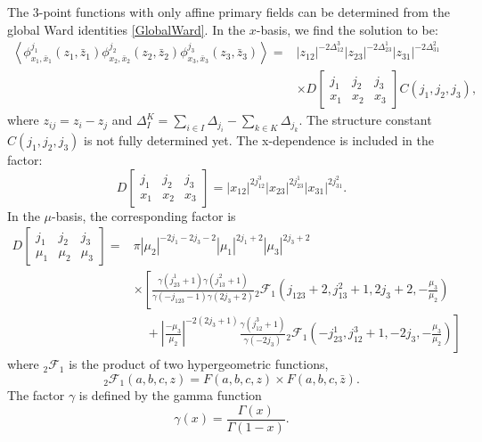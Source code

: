 \documentclass[10pt,a4paper]{article}
\numberwithin{equation}{section}
\newcommand{\vev}[1]{\left\langle #1 \right\rangle}
\begin{document}
The 3-point functions with only affine primary fields can be determined from the global Ward identities \eqref{GlobalWard}. 
In the $x$-basis, we find the solution to be:
\begin{equation}
    \begin{aligned}
            \vev{\phi^{j_{1}}_{x_{1},\bar{x}_{1}}(z_{1},\bar{z}_{1}) \phi^{j_{2}}_{x_{2},\bar{x}_{2}}(z_{2},\bar{z}_{2}) \phi^{j_{3}}_{x_{3},\bar{x}_{3}}(z_{3},\bar{z}_{3})} = &
            |z_{12}|^{-2 \Delta_{12}^{3}} |z_{23}|^{-2 \Delta_{23}^{1}} |z_{31}|^{-2 \Delta_{31}^{2}} \\
            & \times D \left[\begin{array}{ccc}
    j_{1} & j_{2} & j_{3} \\
    x_{1} & x_{2} & x_{3}
    \end{array} \right] C(j_{1},j_{2},j_{3}),
    \end{aligned} \label{3pointfuncx}
\end{equation}
where $z_{ij} = z_{i} - z_{j}$ and $\Delta^{K}_{I} = \sum_{i \in I} \Delta_{j_{i}} - \sum_{k \in K} \Delta_{j_{k}}$. The structure constant 
$C(j_{1},j_{2},j_{3})$ is not fully determined yet. The x-dependence is included in the factor:
\begin{equation}
    D \left[\begin{array}{ccc}
    j_{1} & j_{2} & j_{3} \\
    x_{1} & x_{2} & x_{3}
    \end{array} \right] = |x_{12}|^{2 j_{12}^{3}} |x_{23}|^{2 j_{23}^{1}} |x_{31}|^{2 j_{31}^{2}}.
\end{equation}
In the $\mu$-basis, the corresponding factor is 
\begin{equation}
    \begin{aligned}
        D \left[\begin{array}{ccc}
        j_{1} & j_{2} & j_{3} \\
        \mu_{1} & \mu_{2} & \mu_{3}
        \end{array} \right] = & \pi |\mu_{2}|^{-2 j_{1} - 2 j_{3} - 2} |\mu_{1}|^{2j_{1} + 2} |\mu_{3}|^{2j_{3} + 2} \\
                            & \times \left[\frac{\gamma(j_{23}^{1} + 1) \gamma(j_{13}^{2} + 1)}{\gamma(-j_{123}-1) \gamma(2j_{3}+2)} {}_{2} \mathcal{F}_{1} (j_{123} +2, j_{13}^{2} +1, 2j_{3} + 2, -\frac{\mu_{3}}{\mu_{2}}) \right.\\
                            &\quad + \left. \left| \frac{-\mu_{3}}{\mu_{2}}\right|^{-2(2j_{3}+1)} \frac{\gamma(j_{12}^{3} + 1)}{\gamma(-2 j_{3})} {}_{2} \mathcal{F}_{1} (-j_{23}^{1}, j_{12}^{3} +1, -2j_{3}, -\frac{\mu_{3}}{\mu_{2}}) \right]
    \end{aligned}
\end{equation}
where ${}_{2} \mathcal{F}_{1}$ is the product of two hypergeometric functions, 
\begin{equation}
    {}_{2}\mathcal{F}_{1}(a,b,c,z) = F(a,b,c,z) \times F(a,b,c,\bar{z}).
\end{equation}
The factor $\gamma$ is defined by the gamma function 
\begin{equation}
    \gamma(x) = \frac{\Gamma(x)}{\Gamma(1-x)}.
\end{equation}
\end{document}
